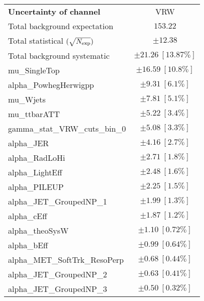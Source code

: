 
\begin{table}
\begin{center}
\setlength{\tabcolsep}{0.0pc}
\begin{tabular*}{\textwidth}{@{\extracolsep{\fill}}lc}
\noalign{\smallskip}\hline\noalign{\smallskip}
{\bf Uncertainty of channel}                                    & VRW            \\
\noalign{\smallskip}\hline\noalign{\smallskip}
Total background expectation             &  $153.22$       \\
\noalign{\smallskip}\hline\noalign{\smallskip}
Total statistical $(\sqrt{N_{\rm exp}})$              & $\pm 12.38$       \\
Total background systematic               & $\pm 21.26\ [13.87\%] $             \\
\noalign{\smallskip}\hline\noalign{\smallskip}
\noalign{\smallskip}\hline\noalign{\smallskip}
mu\_SingleTop         & $\pm 16.59\ [10.8\%] $       \\
alpha\_PowhegHerwigpp         & $\pm 9.31\ [6.1\%] $       \\
mu\_Wjets         & $\pm 7.81\ [5.1\%] $       \\
mu\_ttbarATT         & $\pm 5.22\ [3.4\%] $       \\
gamma\_stat\_VRW\_cuts\_bin\_0         & $\pm 5.08\ [3.3\%] $       \\
alpha\_JER         & $\pm 4.16\ [2.7\%] $       \\
alpha\_RadLoHi         & $\pm 2.71\ [1.8\%] $       \\
alpha\_LightEff         & $\pm 2.48\ [1.6\%] $       \\
alpha\_PILEUP         & $\pm 2.25\ [1.5\%] $       \\
alpha\_JET\_GroupedNP\_1         & $\pm 1.99\ [1.3\%] $       \\
alpha\_cEff         & $\pm 1.87\ [1.2\%] $       \\
alpha\_theoSysW         & $\pm 1.10\ [0.72\%] $       \\
alpha\_bEff         & $\pm 0.99\ [0.64\%] $       \\
alpha\_MET\_SoftTrk\_ResoPerp         & $\pm 0.68\ [0.44\%] $       \\
alpha\_JET\_GroupedNP\_2         & $\pm 0.63\ [0.41\%] $       \\
alpha\_JET\_GroupedNP\_3         & $\pm 0.50\ [0.32\%] $       \\

\end{tabular*}
\end{center}
\end{table}
